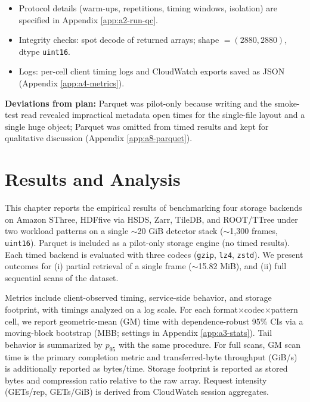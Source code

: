 \documentclass[nomenclature, english, bibtex]{kththesis}
\numberwithin{listing}{chapter}
\begin{document}
\begin{itemize}
  \item Protocol details (warm-ups, repetitions, timing windows, isolation) are specified in Appendix \ref{app:a2-run-qc}.
  \item Integrity checks: spot decode of returned arrays; shape \(=(2880,2880)\), dtype \texttt{uint16}.
  \item Logs: per-cell client timing logs and CloudWatch exports saved as \gls{JSON} (Appendix \ref{app:a4-metrics}).
\end{itemize}

\textbf{Deviations from plan:} Parquet was pilot-only because writing and the smoke-test read revealed impractical metadata open times for the single-file layout and a single huge object; Parquet was omitted from timed results and kept for qualitative discussion (Appendix \ref{app:a8-parquet}).


















\cleardoublepage
\chapter{Results and Analysis}
\label{ch:resultsAndAnalysis}
This chapter reports the empirical results of benchmarking four storage backends on Amazon \gls{SThree}, \gls{HDFfive} via \gls{HSDS}, Zarr, TileDB, and \gls{ROOT}/\gls{TTree} under two workload patterns on a single $\sim$20 GiB detector stack ($\sim$1{,}300 frames, \texttt{uint16}). Parquet is included as a pilot-only storage engine (no timed results). Each timed backend is evaluated with three codecs (\texttt{gzip}, \texttt{lz4}, \texttt{zstd}). We present outcomes for (i) partial retrieval of a single frame ($\sim$15.82 MiB), and (ii) full sequential scans of the dataset.

Metrics include client-observed timing, service-side behavior, and storage footprint, with timings analyzed on a log scale. For each {format$\times$codec$\times$pattern} cell, we report geometric-mean (\gls{GM}) time with dependence-robust 95\% \glspl{CI} via a moving-block bootstrap (\gls{MBB}; settings in Appendix \ref{app:a3-stats}). Tail behavior is summarized by $p_{95}$ with the same procedure. For full scans, \gls{GM} scan time is the primary completion metric and transferred-byte throughput (GiB/s) is additionally reported as bytes/time. Storage footprint is reported as stored bytes and compression ratio relative to the raw array. Request intensity (GETs/rep, GETs/GiB) is derived from CloudWatch session aggregates.
\end{document}
